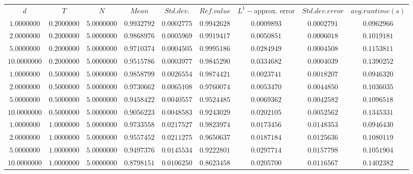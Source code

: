 \begin{tabular}{ccccccccc}
$d$ & $T$ & $N$ & $Mean$ & $Std. dev.$ & $Ref. value$ & $L^1-$approx. error & $Std. dev. error$ & $avg. runtime (s)$\\
$1.0000000$ & $0.2000000$ & $5.0000000$ & $0.9932792$ & $0.0002775$ & $0.9942628$ & $0.0009893$ & $0.0002791$ & $0.0962966$\\
$2.0000000$ & $0.2000000$ & $5.0000000$ & $0.9868976$ & $0.0005969$ & $0.9919417$ & $0.0050851$ & $0.0006018$ & $0.1019181$\\
$5.0000000$ & $0.2000000$ & $5.0000000$ & $0.9710374$ & $0.0004505$ & $0.9995186$ & $0.0284949$ & $0.0004508$ & $0.1153811$\\
$10.0000000$ & $0.2000000$ & $5.0000000$ & $0.9515786$ & $0.0003977$ & $0.9845290$ & $0.0334682$ & $0.0004039$ & $0.1390252$\\
$1.0000000$ & $0.5000000$ & $5.0000000$ & $0.9858799$ & $0.0026554$ & $0.9874421$ & $0.0023741$ & $0.0018207$ & $0.0946320$\\
$2.0000000$ & $0.5000000$ & $5.0000000$ & $0.9730662$ & $0.0065108$ & $0.9760074$ & $0.0053470$ & $0.0044850$ & $0.1036035$\\
$5.0000000$ & $0.5000000$ & $5.0000000$ & $0.9458422$ & $0.0040557$ & $0.9524485$ & $0.0069362$ & $0.0042582$ & $0.1096518$\\
$10.0000000$ & $0.5000000$ & $5.0000000$ & $0.9056223$ & $0.0048583$ & $0.9243029$ & $0.0202105$ & $0.0052562$ & $0.1345331$\\
$1.0000000$ & $1.0000000$ & $5.0000000$ & $0.9733558$ & $0.0217527$ & $0.9823974$ & $0.0173456$ & $0.0148353$ & $0.0946430$\\
$2.0000000$ & $1.0000000$ & $5.0000000$ & $0.9557452$ & $0.0211275$ & $0.9650637$ & $0.0187184$ & $0.0125636$ & $0.1080119$\\
$5.0000000$ & $1.0000000$ & $5.0000000$ & $0.9497376$ & $0.0145534$ & $0.9222801$ & $0.0297714$ & $0.0157798$ & $0.1051904$\\
$10.0000000$ & $1.0000000$ & $5.0000000$ & $0.8798151$ & $0.0106250$ & $0.8623458$ & $0.0205700$ & $0.0116567$ & $0.1402382$\\
\end{tabular}
